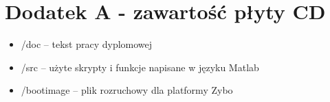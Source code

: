 \chapter{Dodatek A - zawartość płyty CD}
\begin{itemize}
\item /doc -- tekst pracy dyplomowej
\item /src -- użyte skrypty i funkcje napisane w języku Matlab
\item /bootimage -- plik rozruchowy dla platformy Zybo
\end{itemize}








